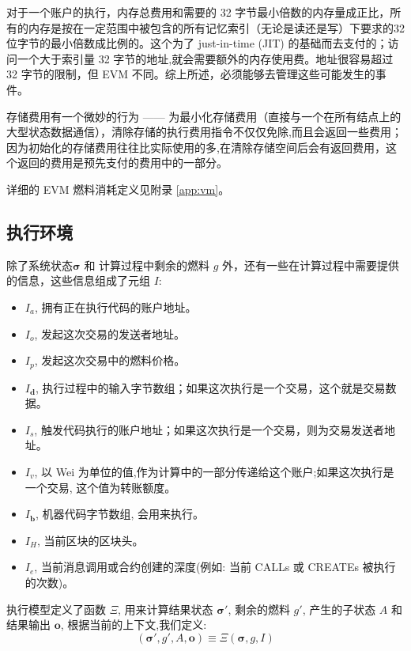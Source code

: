 \documentclass[9pt,oneside]{amsart}
\begin{document}
\begin{multicols}{2}
对于一个账户的执行，内存总费用和需要的 32 字节最小倍数的内存量成正比，所有的内存是按在一定范围中被包含的所有记忆索引（无论是读还是写）下要求的32位字节的最小倍数成比例的。这个为了 just-in-time (JIT) 的基础而去支付的；访问一个大于索引量 32 字节的地址,就会需要额外的内存使用费。地址很容易超过 32 字节的限制，但 EVM 不同。综上所述，必须能够去管理这些可能发生的事件。


存储费用有一个微妙的行为 —— 为最小化存储费用（直接与一个在所有结点上的大型状态数据通信），清除存储的执行费用指令不仅仅免除,而且会返回一些费用；因为初始化的存储费用往往比实际使用的多,在清除存储空间后会有返回费用，这个返回的费用是预先支付的费用中的一部分。

详细的 EVM 燃料消耗定义见附录 \ref{app:vm}。

\subsection{执行环境}

除了系统状态$\boldsymbol{\sigma}$ 和 计算过程中剩余的燃料 $g$ 外，还有一些在计算过程中需要提供的信息，这些信息组成了元组 $I$:
\begin{itemize}
\item $I_a$, 拥有正在执行代码的账户地址。
\item $I_o$, 发起这次交易的发送者地址。
\item $I_p$, 发起这次交易中的燃料价格。
\item $I_\mathbf{d}$, 执行过程中的输入字节数组；如果这次执行是一个交易，这个就是交易数据。
\item $I_s$, 触发代码执行的账户地址；如果这次执行是一个交易，则为交易发送者地址。
\item $I_v$, 以 Wei 为单位的值,作为计算中的一部分传递给这个账户;如果这次执行是一个交易, 这个值为转账额度。
\item $I_\mathbf{b}$, 机器代码字节数组, 会用来执行。
\item $I_H$, 当前区块的区块头。
\item $I_e$, 当前消息调用或合约创建的深度(例如: 当前 {\small CALL}s 或 {\small CREATE}s 被执行的次数)。
\end{itemize}

执行模型定义了函数 $\Xi$, 用来计算结果状态 $\boldsymbol{\sigma}'$, 剩余的燃料 $g'$, 产生的子状态 $A$ 和结果输出 $\mathbf{o}$, 根据当前的上下文,我们定义:
\begin{equation}
(\boldsymbol{\sigma}', g', A, \mathbf{o}) \equiv \Xi(\boldsymbol{\sigma}, g, I)
\end{equation}


\end{multicols}
\end{document}
